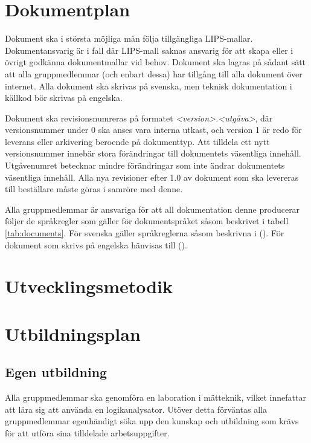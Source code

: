 \documentclass[a4paper,11pt]{article}
\begin{document}
\section{Dokumentplan}
\label{sec:doc_plan}
Dokument ska i största möjliga mån följa tillgängliga LIPS-mallar. Dokumentansvarig är i fall där LIPS-mall saknas ansvarig för att skapa eller i övrigt godkänna dokumentmallar vid behov. Dokument ska lagras på sådant sätt att alla gruppmedlemmar (och enbart dessa) har tillgång till alla dokument över internet. Alla dokument ska skrivas på svenska, men teknisk dokumentation i källkod bör skrivas på engelska. 

Dokument ska revisionsnumreras på formatet \textit{\textless version\textgreater .\textless utgåva\textgreater}, där versionsnummer under 0 ska anses vara interna utkast, och version 1 är redo för leverans eller arkivering beroende på dokumenttyp. Att tilldela ett nytt versionsnummer innebär stora förändringar till dokumentets väsentliga innehåll. Utgåvenumret betecknar mindre förändringar som inte ändrar dokumentets väsentliga innehåll. Alla nya revisioner efter 1.0 av dokument som ska levereras till beställare måste göras i samröre med denne.

Alla gruppmedlemmar är ansvariga för att all dokumentation denne producerar följer de språkregler som gäller för dokumentspråket såsom beskrivet i tabell \ref{tab:documents}. För svenska gäller språkreglerna såsom beskrivna i  (\cite{Sprakradet2008}). För dokument som skrivs på engelska hänvisas till  (\cite{Ritter2003}).

\label{tab:documents}
\section{Utvecklingsmetodik}

\section{Utbildningsplan}
\subsection{Egen utbildning}
Alla gruppmedlemmar ska genomföra en laboration i mätteknik, vilket innefattar att lära sig att använda en logikanalysator. Utöver detta förväntas alla gruppmedlemmar egenhändigt söka upp den kunskap och utbildning som krävs för att utföra sina tilldelade arbetsuppgifter.
\end{document}

